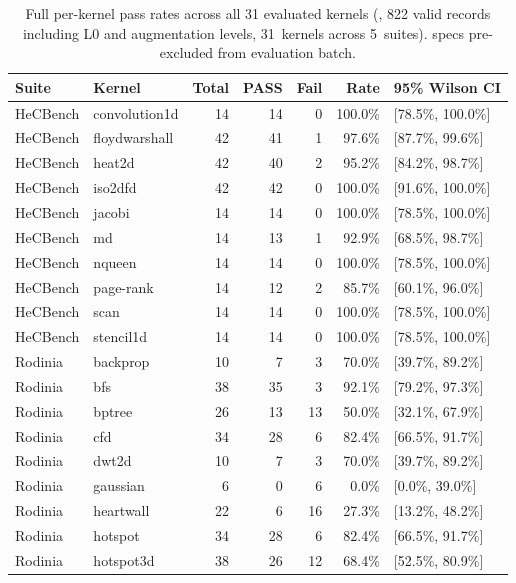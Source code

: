 \begin{table}[t]
\centering
\caption{Full per-kernel pass rates across all 31 evaluated kernels (\gptnew{}, 822 valid records including L0 and augmentation levels, 31~kernels across 5~suites). \knownfail{} specs pre-excluded from evaluation batch.}
\label{tab:per-kernel-full-gpt54}
\footnotesize
\begin{tabular}{@{}llrrrrl@{}}
\toprule
Suite & Kernel & Total & PASS & Fail & Rate & 95\% Wilson CI \\
\midrule
HeCBench & convolution1d & 14 & 14 & 0 & 100.0\% & [78.5\%, 100.0\%] \\
HeCBench & floydwarshall & 42 & 41 & 1 & 97.6\% & [87.7\%, 99.6\%] \\
HeCBench & heat2d & 42 & 40 & 2 & 95.2\% & [84.2\%, 98.7\%] \\
HeCBench & iso2dfd & 42 & 42 & 0 & 100.0\% & [91.6\%, 100.0\%] \\
HeCBench & jacobi & 14 & 14 & 0 & 100.0\% & [78.5\%, 100.0\%] \\
HeCBench & md & 14 & 13 & 1 & 92.9\% & [68.5\%, 98.7\%] \\
HeCBench & nqueen & 14 & 14 & 0 & 100.0\% & [78.5\%, 100.0\%] \\
HeCBench & page-rank & 14 & 12 & 2 & 85.7\% & [60.1\%, 96.0\%] \\
HeCBench & scan & 14 & 14 & 0 & 100.0\% & [78.5\%, 100.0\%] \\
HeCBench & stencil1d & 14 & 14 & 0 & 100.0\% & [78.5\%, 100.0\%] \\
\midrule
Rodinia & backprop & 10 & 7 & 3 & 70.0\% & [39.7\%, 89.2\%] \\
Rodinia & bfs & 38 & 35 & 3 & 92.1\% & [79.2\%, 97.3\%] \\
Rodinia & bptree & 26 & 13 & 13 & 50.0\% & [32.1\%, 67.9\%] \\
Rodinia & cfd & 34 & 28 & 6 & 82.4\% & [66.5\%, 91.7\%] \\
Rodinia & dwt2d & 10 & 7 & 3 & 70.0\% & [39.7\%, 89.2\%] \\
Rodinia & gaussian & 6 & 0 & 6 & 0.0\% & [0.0\%, 39.0\%] \\
Rodinia & heartwall & 22 & 6 & 16 & 27.3\% & [13.2\%, 48.2\%] \\
Rodinia & hotspot & 34 & 28 & 6 & 82.4\% & [66.5\%, 91.7\%] \\
Rodinia & hotspot3d & 38 & 26 & 12 & 68.4\% & [52.5\%, 80.9\%] \\

\end{tabular}
\end{table}

